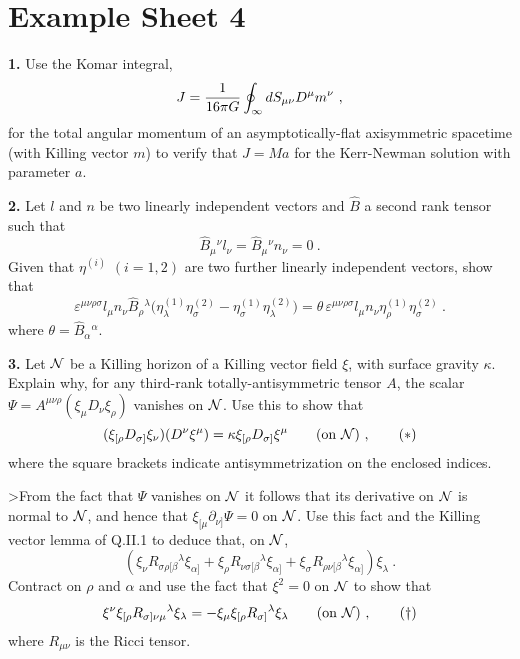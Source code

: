\vfill\eject


\section{Example Sheet 4}

\noindent
{\bf 1.} Use the Komar integral,
$$
J= {1\over 16\pi G}\oint_\infty dS_{\mu\nu}D^\mu m^\nu\ ,
$$
for the total angular momentum of an asymptotically-flat axisymmetric
spacetime (with Killing vector $m$) to verify that $J=Ma$ for the
Kerr-Newman solution with parameter $a$.

\vskip 10pt
\noindent
{\bf 2.} Let $l$ and $n$ be two linearly independent vectors and
$\hat B$ a second rank tensor such that
$$
\hat B_\mu{}^\nu l_\nu =\hat B_\mu{}^\nu n_\nu =0\ .
$$
Given that $\eta^{(i)}$ $(i=1,2)$ are two further linearly
independent vectors, show that
$$
\varepsilon^{\mu\nu\rho\sigma}l_\mu n_\nu \hat B_\rho{}^\lambda
\big(\eta^{(1)}_\lambda\eta^{(2)}_\sigma - 
\eta^{(1)}_\sigma\eta^{(2)}_\lambda\big) =  \theta\, 
\varepsilon^{\mu\nu\rho\sigma} l_\mu n_\nu
\eta_\rho^{(1)}\eta_\sigma^{(2)}\ .
$$
where $\theta= \hat B_\alpha{}^\alpha$.

\vskip 10pt
\noindent
{\bf 3.} Let ${\cal N}$ be a Killing horizon of a Killing vector field
$\xi$, with surface gravity $\kappa$. Explain why, for any third-rank
totally-antisymmetric tensor $A$, the scalar 
$\Psi = A^{\mu\nu\rho}(\xi_\mu D_\nu\xi_\rho)$ vanishes on ${\cal N}$.
Use this to show that
$$
(\xi_{[\rho}D_{\sigma]} \xi_\nu)(D^\nu\xi^\mu) =\kappa
\xi_{[\rho}D_{\sigma]}\xi^\mu \qquad ({\rm on}\ {\cal N})\ ,\qquad (*)
$$
where the square brackets indicate antisymmetrization on the enclosed
indices.

>From the fact that $\Psi$ vanishes on ${\cal N}$ it follows that its
derivative on ${\cal N}$ is normal to ${\cal N}$, and hence that
$\xi_{[\mu}\partial_{\nu]}\Psi=0$ on ${\cal N}$. Use this fact and the
Killing vector lemma of Q.II.1 to deduce that, on ${\cal N}$,
$$
(\xi_\nu R_{\sigma\rho[\beta}{}^\lambda\xi_{\alpha]}
+\xi_\rho R_{\nu\sigma[\beta}{}^\lambda\xi_{\alpha]}
+\xi_\sigma R_{\rho\nu[\beta}{}^\lambda\xi_{\alpha]})\xi_\lambda\ .
$$
Contract on $\rho$ and $\alpha$ and use the fact that $\xi^2=0$ on
${\cal N}$ to show that
$$
\xi^\nu\xi_{[\rho}R_{\sigma]\nu\mu}{}^\lambda\xi_\lambda =
-\xi_\mu\xi_{[\rho}R_{\sigma]}{}^\lambda\xi_\lambda
\qquad ({\rm on}\ {\cal N})\ ,\qquad (\dagger)
$$
where $R_{\mu\nu}$ is the Ricci tensor.

